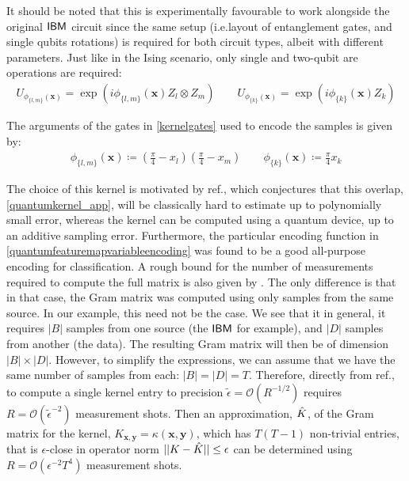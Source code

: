 It should be noted that this is experimentally favourable to work alongside the original $\textsf{IBM}$ circuit since the same setup (i.e.\@ layout of entanglement gates, and single qubits rotations) is required for both circuit types, albeit with different parameters. Just like in the Ising scenario, only single and two-qubit are operations are required:
\begin{align}
	U_{\phi_{\{l,m\}}(\mathbf{x})} = \exp\left(i\phi_{\{l,m\}}	(\mathbf{x})Z_l\otimes Z_m\right) \qquad U_{\phi_{\{k\}}(\mathbf{x})} = \exp\left(i\phi_{\{k\}}(\mathbf{x})Z_k\right) \label{kernelgates}
\end{align}

The arguments of the gates in \eqref{kernelgates} used to encode the samples is given by:
\begin{align}
\phi_{\{l, m\}}(\mathbf{x})   \coloneqq \left(\frac{\pi}{4} - x_l\right)\left(\frac{\pi}{4} - x_m\right) \qquad
\phi_{\{k\}}(\mathbf{x})  \coloneqq \frac{\pi}{4}x_k \label{quantumfeaturemapvariableencoding}
\end{align}

The choice of this kernel is motivated by ref., which conjectures that this overlap, \eqref{quantumkernel_app}, will be classically hard to estimate up to polynomially small error, whereas the kernel can be computed using a quantum device, up to an additive sampling error. Furthermore, the particular encoding function in \eqref{quantumfeaturemapvariableencoding} was found to be a good all-purpose encoding for classification. A rough bound for the number of measurements required to compute the full matrix is also given by . The only difference is that in that case, the Gram matrix was computed using only samples from the same source. In our example, this need not be the case. We see that it in general, it requires $|B|$ samples from one source (the $\textsf{IBM}$ for example), and $|D|$ samples from another (the data). The resulting Gram matrix will then be of dimension $|B| \times |D|$. However, to simplify the expressions, we can assume that we have the same number of samples from each: $|B| = |D| = T$. Therefore, directly from ref., to compute a single kernel entry to precision $\tilde{\epsilon} = \mathcal{O}(R^{-1/2})$ requires $R  = \mathcal{O}(\tilde{\epsilon}^{-2})$ measurement shots. Then an approximation, $\Hat{K}$, of the Gram matrix for the kernel, $K_{\mathbf{x}, \mathbf{y}} = \kappa(\mathbf{x}, \mathbf{y})$, which has $T(T - 1)$  non-trivial entries, that is $\epsilon$-close in operator norm $||K - \Hat{K}|| \leq \epsilon$ can be determined using $R = \mathcal{O}(\epsilon^{-2}T^4)$ measurement shots.

